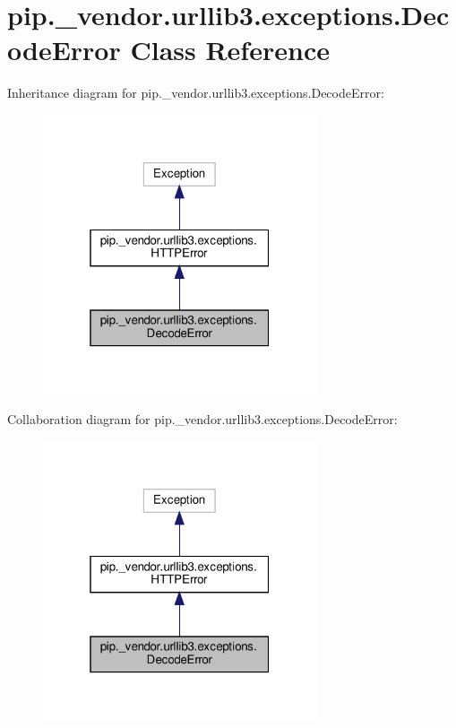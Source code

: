 \hypertarget{classpip_1_1__vendor_1_1urllib3_1_1exceptions_1_1DecodeError}{}\section{pip.\+\_\+vendor.\+urllib3.\+exceptions.\+Decode\+Error Class Reference}
\label{classpip_1_1__vendor_1_1urllib3_1_1exceptions_1_1DecodeError}


Inheritance diagram for pip.\+\_\+vendor.\+urllib3.\+exceptions.\+Decode\+Error\+:
\nopagebreak
\begin{figure}[H]
\begin{center}
\leavevmode
\includegraphics[width=229pt]{classpip_1_1__vendor_1_1urllib3_1_1exceptions_1_1DecodeError__inherit__graph}
\end{center}
\end{figure}


Collaboration diagram for pip.\+\_\+vendor.\+urllib3.\+exceptions.\+Decode\+Error\+:
\nopagebreak
\begin{figure}[H]
\begin{center}
\leavevmode
\includegraphics[width=229pt]{classpip_1_1__vendor_1_1urllib3_1_1exceptions_1_1DecodeError__coll__graph}
\end{center}
\end{figure}


